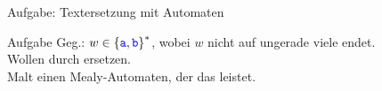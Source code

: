 \begin{frame}{Aufgabe: Textersetzung mit Automaten}
	\begin{block}{Aufgabe}
		Geg.: \quad $w \in \left\{\hbox{\textcolor{blue}{\texttt{a}}}, \hbox{\textcolor{blue}{\texttt{b}}}\right\}^*$, wobei $w$ nicht auf ungerade viele  endet. \\
		Wollen  durch  ersetzen. \\
		Malt einen Mealy-Automaten, der das leistet. \\
		\pause
		\bigskip
	\end{block}
	
	
\end{frame}